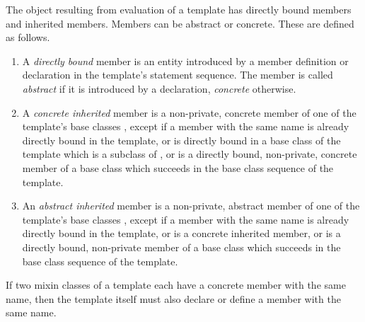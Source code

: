 \documentclass[11pt]{report}
\newcommand{\ifqualified}[1]{}
\begin{document}
The object resulting from evaluation of a template has directly bound
members and inherited members. Members can be abstract or concrete.
These are defined as follows.
\begin{enumerate}
\item
A {\em directly bound} member is an entity introduced by a member
definition or declaration in the template's statement sequence. The
member is called {\em abstract} if it is introduced by a declaration,
{\em concrete} otherwise.
\item
A {\em concrete inherited} member is a non-private, concrete member of
one of the template's base classes \verb@B@, except if a member with the
same \ifqualified{qualified} name is already directly bound in the template, or is
directly bound in a base class of the template which is a subclass of
\verb@B@, or is a directly bound, non-private, concrete member of a base
class which succeeds \verb@B@ in the base class sequence of the template.
\item
An {\em abstract inherited} member is a non-private, abstract member
of one of the template's base classes \verb@B@, except if a member with the
same \ifqualified{qualified} name is already directly bound in the template, or is a
concrete inherited member, or is a directly bound, non-private member
of a base class which succeeds \verb@b@ in the base class sequence of the
template.
\end{enumerate}

If two mixin classes of a template each have a concrete member
with the same name, then the template itself must also declare or
define a member with the same name.
\end{document}
